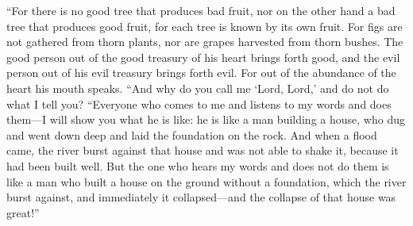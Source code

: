 \begin{biblechapter}
 “For there is no good tree that produces bad fruit, nor on the other hand a bad tree that produces good fruit,
\verse for each tree is known by its own fruit. For figs are not gathered from thorn plants, nor are grapes harvested from thorn bushes.
\verse The good person out of the good treasury of his heart brings forth good, and the evil person out of his evil treasury brings forth evil. For out of the abundance of the heart his mouth speaks.
\verse “And why do you call me ‘Lord, Lord,’ and do not do what I tell you?
 “Everyone who comes to me and listens to my words and does them—I will show you what he is like:
\verse he is like a man building a house, who dug and went down deep and laid the foundation on the rock. And when a flood came, the river burst against that house and was not able to shake it, because it had been built well.
\verse But the one who hears my words and does not do them is like a man who built a house on the ground without a foundation, which the river burst against, and immediately it collapsed—and the collapse of that house was great!”
\end{biblechapter}

